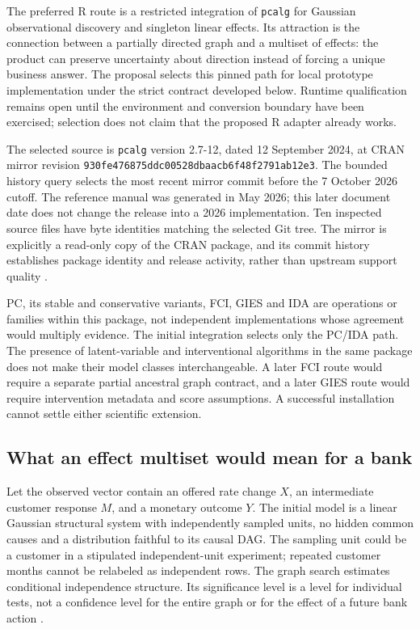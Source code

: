 \label{exec13:pcalg-reuse}

The preferred R route is a restricted integration of \texttt{pcalg} for
Gaussian observational discovery and singleton linear effects. Its
attraction is the connection between a partially directed graph and a
multiset of effects: the product can preserve uncertainty about
direction instead of forcing a unique business answer. The proposal
selects this pinned path for local prototype implementation under the
strict contract developed below. Runtime qualification remains open
until the environment and conversion boundary have been exercised;
selection does not claim that the proposed R adapter already works.

The selected source is \texttt{pcalg} version 2.7-12, dated 12 September
2024, at CRAN mirror revision
\texttt{930fe476875ddc00528dbaacb6f48f2791ab12e3}. The bounded history
query selects the most recent mirror commit before the 7 October 2026
cutoff. The reference manual was generated in May 2026; this later
document date does not change the release into a 2026 implementation.
Ten inspected source files have byte identities matching the selected
Git tree. The mirror is explicitly a read-only copy of the CRAN package,
and its commit history establishes package identity and release
activity, rather than upstream support quality
\citep{exec13_pcalg,exec13_pcalg_reuse_primary}.

PC, its stable and conservative variants, FCI, GIES and IDA are
operations or families within this package, not independent
implementations whose agreement would multiply evidence. The initial
integration selects only the PC/IDA path. The presence of
latent-variable and interventional algorithms in the same package does
not make their model classes interchangeable. A later FCI route would
require a separate partial ancestral graph contract, and a later GIES
route would require intervention metadata and score assumptions. A
successful installation cannot settle either scientific extension.

\hypertarget{what-an-effect-multiset-would-mean-for-a-bank}{%
\subsection{What an effect multiset would mean for a
bank}\label{what-an-effect-multiset-would-mean-for-a-bank}}

Let the observed vector contain an offered rate change \(X\), an
intermediate customer response \(M\), and a monetary outcome \(Y\). The
initial model is a linear Gaussian structural system with independently
sampled units, no hidden common causes and a distribution faithful to
its causal DAG. The sampling unit could be a customer in a stipulated
independent-unit experiment; repeated customer months cannot be
relabeled as independent rows. The graph search estimates conditional
independence structure. Its significance level is a level for individual
tests, not a confidence level for the entire graph or for the effect of
a future bank action \citep{exec13_pcalg}.

